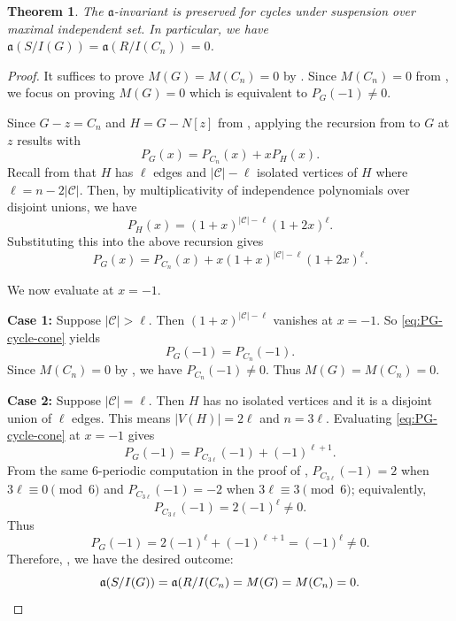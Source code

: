 \documentclass[12pt]{amsart}
\theoremstyle{plain}
\newtheorem{thm}{Theorem}[section]
\theoremstyle{definition}
\begin{document}
\begin{thm}\label{thm:cycle_a-inv}
The $\mathfrak a$-invariant is preserved for cycles under suspension over maximal independent set.  In particular, we have $\mathfrak{a} (S/ I(G)) = \mathfrak{a} (R/I(C_n))=0$.
\end{thm}



\begin{proof}
It suffices to prove $M(G)=M(C_n)=0$ by . Since  $M(C_n)=0$  from , we focus on proving $M(G)=0$ which is equivalent to 
\(P_G(-1)\neq 0\).

Since \(G-z=C_n\) and $H=G-N[z]$ from , applying the recursion from   to $G$ at \(z\) results with
\[
P_G(x)=P_{C_n}(x)+x P_{H}(x).
\]
Recall from   that $H$ has   \(\ell\) edges and  \(|\mathcal C|-\ell\) isolated vertices of \(H\) where \(\ell=n-2|\mathcal{C}|\). Then, by multiplicativity of independence polynomials over disjoint unions, we have
\[
P_H(x)=(1+x)^{|\mathcal C|-\ell}(1+2x)^\ell.
\]
Substituting this into the above recursion gives
\begin{equation}\label{eq:PG-cycle-cone}
P_G(x)=P_{C_n}(x)+x(1+x)^{|\mathcal C|-\ell}(1+2x)^\ell.
\end{equation}

We now evaluate at \(x=-1\).

\textbf{Case 1:} Suppose \(|\mathcal C|>\ell\).
Then \((1+x)^{|\mathcal C|-\ell}\) vanishes at \(x=-1\). So \eqref{eq:PG-cycle-cone} yields
\[
P_G(-1)=P_{C_n}(-1).
\]
Since $M(C_n)=0$ by , we have $P_{C_n}(-1)\neq 0$. Thus $M(G)=M(C_n)=0$.

\textbf{Case 2:} Suppose \(|\mathcal C|=\ell\).
Then \(H\) has no isolated vertices and it is a disjoint union of \(\ell\) edges. This means \(|V(H)|=2\ell\)
and  \(n=3\ell\).
Evaluating \eqref{eq:PG-cycle-cone} at \(x=-1\) gives
\[
P_G(-1)=P_{C_{3\ell}}(-1)+(-1)^{\ell+1}.
\]
From the same \(6\)-periodic computation in the proof of ,
\(P_{C_{3\ell}}(-1)=2\) when \(3\ell\equiv 0\pmod 6\) and \(P_{C_{3\ell}}(-1)=-2\) when
\(3\ell\equiv 3\pmod 6\); equivalently,
\[
P_{C_{3\ell}}(-1)=2(-1)^\ell \neq 0.
\]
Thus
\[
P_G(-1)=2(-1)^\ell+(-1)^{\ell+1}=(-1)^\ell\neq 0.
\]
Therefore, , we have the desired outcome:
 \[
 \mathfrak{a}(S/I(G))=\mathfrak{a}(R/I(C_n)=M(G)=M(C_n)=0.\qedhere
 \]
\end{proof}
\end{document}
